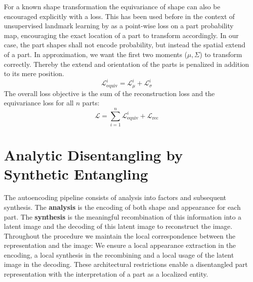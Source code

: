 	For a known shape transformation the equivariance of shape can also be encouraged explicitly with a loss. This has been used before in the context of unsupervised landmark learning by \cite{thewlis17, zhang18} as a point-wise loss on a part probability map, encouraging the exact location of a part to transform accordingly. In our case, the part shapes shall not encode probability, but instead the spatial extend of a part. In approximation, we want the first two moments ($\mu, \Sigma$) to transform correctly. Thereby the extend and orientation of the parts is penalized in addition to its mere position.
	\begin{equation}
		\mathcal{L}_{\textrm{equiv}}^i = \mathcal{L}_{\mu}^i+ \mathcal{L}_{\sigma}^i
	\label{covariance}
	\end{equation}
	The overall loss objective is the sum of the reconstruction loss and the equivariance loss for all $n$ parts:
	\begin{equation}
	\mathcal{L} = \sum_{i=1}^n \mathcal{L}_{\text{equiv}}^i + \mathcal{L}_{\textrm{rec}}
	\end{equation}


\section{Analytic Disentangling by Synthetic Entangling}\label{sec:architecture}
	The autoencoding pipeline consists of analysis into factors and subsequent synthesis. The \textbf{analysis} is the {encoding} of both shape and appearance for each part. The \textbf{synthesis} is the meaningful {recombination} of this information into a latent image and the {decoding} of this latent image to reconstruct the image. %
	Throughout the procedure we maintain the local correspondence between the representation and the image: We ensure a local appearance extraction in the encoding, a local synthesis in the recombining and a local usage of the latent image in the decoding. These architectural restrictions enable a disentangled part representation with the interpretation of a part as a localized entity. \\

